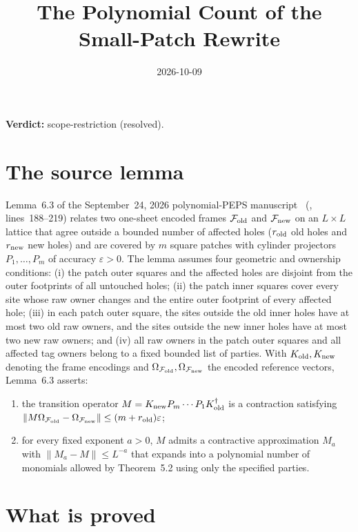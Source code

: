 \documentclass{article}
\title{The Polynomial Count of the Small-Patch Rewrite}
\author{}
\date{2026-10-09}
\providecommand{\gapnote}[2]{\par\noindent\textbf{Verdict:} #1 (#2).\par}
\begin{document}
\maketitle
\gapnote{scope-restriction}{resolved}

\section{The source lemma}

Lemma~6.3 of the September~24, 2026 polynomial-PEPS
manuscript~\cite{OpenAI2026PolynomialPEPS} (,
lines~188--219) relates two one-sheet encoded frames $\mathcal F_{\rm old}$ and
$\mathcal F_{\rm new}$ on an $L\times L$ lattice that agree outside a bounded
number of affected holes ($r_{\rm old}$ old holes and $r_{\rm new}$ new holes)
and are covered by $m$ square patches with cylinder projectors $P_1,\dots,P_m$
of accuracy $\varepsilon>0$. The lemma assumes four geometric and ownership
conditions: (i) the patch outer squares and the affected holes are disjoint
from the outer footprints of all untouched holes; (ii) the patch inner squares
cover every site whose raw owner changes and the entire outer footprint of
every affected hole; (iii) in each patch outer square, the sites outside the
old inner holes have at most two old raw owners, and the sites outside the new
inner holes have at most two new raw owners; and (iv) all raw owners in the
patch outer squares and all affected tag owners belong to a fixed bounded list
of parties. With $K_{\rm old},K_{\rm new}$ denoting the frame encodings and
$\Omega_{\mathcal F_{\rm old}},\Omega_{\mathcal F_{\rm new}}$ the encoded
reference vectors, Lemma~6.3 asserts:
\begin{enumerate}
\item the transition operator
  $M=K_{\rm new}P_m\cdots P_1K_{\rm old}^{\dagger}$ is a contraction satisfying
  $\|M\Omega_{\mathcal F_{\rm old}}-\Omega_{\mathcal F_{\rm new}}\|
   \le(m+r_{\rm old})\varepsilon$;
\item for every fixed exponent $a>0$, $M$ admits a contractive approximation
  $M_a$ with $\|M_a-M\|\le L^{-a}$ that expands into a polynomial number of
  monomials allowed by Theorem~5.2 using only the specified parties.
\end{enumerate}

\section{What is proved}
\end{document}
